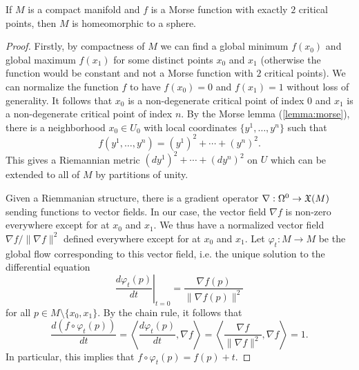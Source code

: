 \begin{theorem}[Reeb]\label{thm:reeb}
	If $M$ is a compact manifold and $f$ is a Morse function with exactly $2$ critical points, then $M$ is homeomorphic to a sphere.
\end{theorem}
\begin{proof}
	Firstly, by compactness of $M$ we can find a global minimum $f(x_0)$ and global maximum $f(x_1)$ for some distinct points $x_0$ and $x_1$ (otherwise the function would be constant and not a Morse function with $2$ critical points). We can normalize the function $f$ to have $f(x_0)=0$ and $f(x_1)=1$ without loss of generality. It follows that $x_0$ is a non-degenerate critical point of index 0 and $x_1$ is a non-degenerate critical point of index $n$.
	By the Morse lemma (\ref{lemma:morse}), there is a neighborhood $x_0\in U_0$ with local coordinates $\{y^1,\ldots, y^n\}$ such that 
	\[
			f(y^1,\ldots, y^n) = (y^1)^2 + \cdots + (y^n)^2.
	\]
	This gives a Riemannian metric $(dy^1)^2+\cdots+(dy^n)^2$ on $U$ which can be extended to all of $M$ by partitions of unity.

	Given a Riemmanian structure, there is a gradient operator $\nabla : \Omega^0 \to \operatorname{\mathfrak{X}}(M)$ sending functions to vector fields.
	In our case, the vector field $\nabla f$ is non-zero everywhere except for at $x_0$ and $x_1$. We thus have a normalized vector field $\nabla f/\|\nabla f\|^2$
	defined everywhere except for at $x_0$ and $x_1$. Let $\varphi_t : M \to M$ be the global flow corresponding to this vector field, i.e. the unique solution to the differential equation
	\[
	\left.\frac{d\varphi_t(p)}{dt}\right|_{t=0} = \frac{\nabla f(p)}{\|\nabla f(p)\|^2}
	\]
	for all $p\in M\setminus \{x_0,x_1\}$. By the chain rule, it follows that
	\[
		\frac{d(f\circ \varphi_t(p))}{dt}=\left\langle \frac{d\varphi_t(p)}{dt}, \nabla f\right\rangle = \left\langle \frac{\nabla f}{\|\nabla f\|^2}, \nabla f\right\rangle=1.
	\]
	In particular, this implies that $f\circ \varphi_t(p) = f(p)+t$. 

\end{proof}

